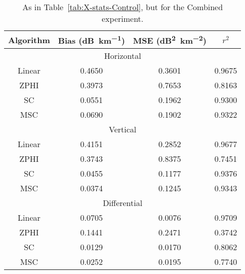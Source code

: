 \begin{table}
    \centering
    \begin{tabular}{| c | c | c | c |}
        \hline
        Algorithm & Bias (\si{dB\per \kilo\meter}) & MSE (\si{dB\squared \per \kilo\meter \squared}) & $r^2$ \\
        \hline
        \hline
        \multicolumn{4}{|c|}{Horizontal}\\
        \hline
        Linear & 0.4650 & 0.3601 & 0.9675\\
        ZPHI & 0.3973 & 0.7653 & 0.8163\\
        SC & 0.0551 & 0.1962 & 0.9300\\
        MSC & 0.0690 & 0.1902 & 0.9322\\
        \hline
        \multicolumn{4}{|c|}{Vertical}\\
        \hline
        Linear & 0.4151 & 0.2852 & 0.9677\\
        ZPHI & 0.3743 & 0.8375 & 0.7451\\
        SC & 0.0455 & 0.1177 & 0.9376\\
        MSC & 0.0374 & 0.1245 & 0.9343\\
        \hline
        \multicolumn{4}{|c|}{Differential}\\
        \hline
        Linear & 0.0705 & 0.0076 & 0.9709\\
        ZPHI & 0.1441 & 0.2471 & 0.3742\\
        SC & 0.0129 & 0.0170 & 0.8062\\
        MSC & 0.0252 & 0.0195 & 0.7740\\
\hline
    \end{tabular}
    \caption{As in Table~\ref{tab:X-stats-Control}, but for
    the Combined experiment.}
    \label{tab:X-stats-Combined}
\end{table}
